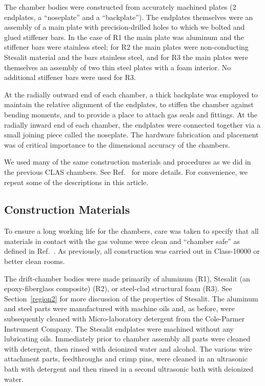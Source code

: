 The chamber bodies were constructed from accurately machined plates
(2 endplates, a ``noseplate'' and a ``backplate'').
The endplates themselves were an assembly of a main plate with precision-drilled
holes to which we bolted and glued stiffener bars.  In the case of
R1 the main plate was aluminum and the stiffener bars were stainless steel;
for R2 the main plates were non-conducting Stesalit material and the bars stainless steel, and for R3
the main plates were themselves an assembly of two thin steel plates with a foam interior.
No additional stiffener bars were used for R3.

At the radially outward end of each chamber, a thick backplate was 
employed to maintain the relative 
alignment of the endplates, to stiffen the chamber against bending moments, 
and to provide a place to attach gas seals and fittings. At the radially inward 
end of each chamber, the endplates were connected together via a small joining 
piece called the noseplate.  The hardware fabrication and placement 
was of critical importance to the dimensional accuracy of the chambers.

We used many of the same construction materials and procedures as we did
in the previous CLAS chambers.  See Ref.~\cite{dcnim} for more details. For
convenience, we repeat some of the descriptions in this article.

\subsection{Construction Materials}
\label{materials}

To ensure a long working life for the chambers, care was taken to 
specify that all materials in contact with the gas volume were clean and ``chamber 
safe'' as defined in Ref.~\cite{kadyk}.  As previously, all construction was carried out in 
Class-10000 or better clean rooms.

The drift-chamber bodies were made primarily of aluminum (R1), Stesalit (an epoxy-fiberglass composite) (R2),
or steel-clad structural foam (R3). See Section~\ref{region2} for more discussion
of the properties of Stesalit.  The aluminum and steel parts were 
manufactured with machine oils and, as before, were subsequently cleaned with  
Micro-laboratory detergent from the Cole-Parmer Instrument Company.  The 
Stesalit endplates were machined without any lubricating oils. Immediately 
prior to chamber assembly all parts were cleaned with detergent, then rinsed with
deionized water and alcohol.  The various wire attachment parts, feedthroughs and
crimp pins, were cleaned in an ultrasonic bath 
with detergent and then rinsed in a second ultrasonic bath with deionized water.

